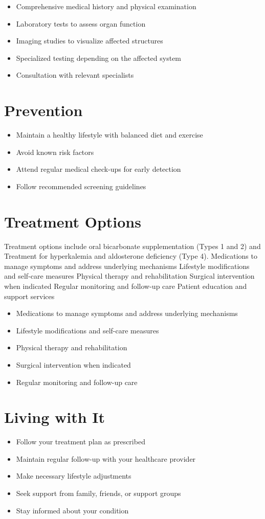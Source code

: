 \begin{itemize}[noitemsep]
  \item Comprehensive medical history and physical examination
  \item Laboratory tests to assess organ function
  \item Imaging studies to visualize affected structures
  \item Specialized testing depending on the affected system
  \item Consultation with relevant specialists
\end{itemize}
\section{Prevention}
\begin{itemize}[noitemsep]
  \item Maintain a healthy lifestyle with balanced diet and exercise
  \item Avoid known risk factors
  \item Attend regular medical check-ups for early detection
  \item Follow recommended screening guidelines
\end{itemize}
\section{Treatment Options}
Treatment options include oral bicarbonate supplementation (Types 1 and 2) and Treatment for hyperkalemia and aldosterone deficiency (Type 4). Medications to manage symptoms and address underlying mechanisms Lifestyle modifications and self-care measures Physical therapy and rehabilitation Surgical intervention when indicated Regular monitoring and follow-up care Patient education and support services

\begin{itemize}[noitemsep]
  \item Medications to manage symptoms and address underlying mechanisms
  \item Lifestyle modifications and self-care measures
  \item Physical therapy and rehabilitation
  \item Surgical intervention when indicated
  \item Regular monitoring and follow-up care
\end{itemize}
\section{Living with It}
\begin{itemize}[noitemsep]
  \item Follow your treatment plan as prescribed
  \item Maintain regular follow-up with your healthcare provider
  \item Make necessary lifestyle adjustments
  \item Seek support from family, friends, or support groups
  \item Stay informed about your condition
\end{itemize}
